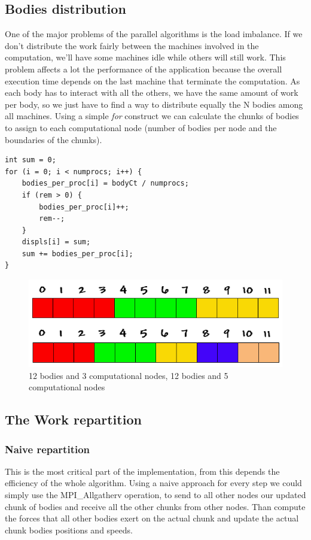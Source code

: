 \documentclass[a4paper]{article}
\begin{document}
\subsection{Bodies distribution}
\label{sec:bodies_distr}
One of the major problems of the parallel algorithms is the load imbalance. If we don't distribute the work fairly between the machines involved in the computation, we'll have some machines idle while others will still work. This problem affects a lot the performance of the application because the overall execution time depends on the last machine that terminate the computation. As each body has to interact with all the others, we have the same amount of work per body, so we just have to find a way to distribute equally the N bodies among all machines. Using a simple \textit{for} construct we can calculate the chunks of bodies to assign to each computational node (number of bodies per node and the boundaries of the chunks).

\begin{lstlisting}
int sum = 0;
for (i = 0; i < numprocs; i++) {
    bodies_per_proc[i] = bodyCt / numprocs;
    if (rem > 0) {
        bodies_per_proc[i]++;
        rem--;
    }
    displs[i] = sum;
    sum += bodies_per_proc[i];
}
\end{lstlisting}

\begin{figure}[ht]
  \centering\includegraphics[width=0.6\linewidth]{array_procs_both}
  \caption{12 bodies and 3 computational nodes, 12 bodies and 5 computational nodes}
  \label{fig:3nodes}
\end{figure}
\FloatBarrier

\subsection{The Work repartition}
\label{sec:work_rep}

\subsubsection{Naive repartition}
\label{sec:naive_rep}

This is the most critical part of the implementation, from this depends the efficiency of the whole algorithm. 
Using a naive approach for every step we could simply use the MPI\_Allgatherv operation, to send to all other nodes our updated chunk of bodies and receive all the other chunks from other nodes. Than compute the forces that all other bodies exert on the actual chunk and update the actual chunk bodies positions and speeds. 
\end{document}
